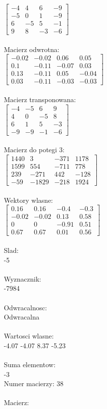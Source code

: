 \documentclass[a4paper,12pt]{article}
\begin{document}
$\begin{bmatrix} -4&4&6&-9\\-5&0&1&-9\\6&-5&5&-1\\9&8&-3&-6 \end{bmatrix}$
\\
\\
Macierz odwrotna:\\

$\begin{bmatrix} -0.02&-0.02&0.06&0.05\\0.1&-0.11&-0.07&0.03\\0.13&-0.11&0.05&-0.04\\0.03&-0.11&-0.03&-0.03 \end{bmatrix}$
\\
\\
Macierz transponowana:\\

$\begin{bmatrix} -4&-5&6&9\\4&0&-5&8\\6&1&5&-3\\-9&-9&-1&-6 \end{bmatrix}$
\\
\\
Macierz do potegi 3:\\

$\begin{bmatrix} 1440&3&-371&1178\\1599&554&-711&778\\239&-271&442&-128\\-59&-1829&-218&1924 \end{bmatrix}$
\\
\\
Wektory wlasne:\\

$\begin{bmatrix} 0.16&0.16&-0.4&-0.3\\-0.02&-0.02&0.13&0.58\\0&0&-0.91&0.51\\0.67&0.67&0.01&0.56 \end{bmatrix}$
\\
\\
Slad:\\
-5
\\
\\
Wyznacznik:\\
-7984
\\
\\
Odwracalnosc:\\
Odwracalna
\\
\\
Wartosci wlasne:\\
-4.07 -4.07 8.37 -5.23
\\
\\
Suma elementow:\\
-3
\\
\newpage
Numer macierzy:
38
\\
\\
Macierz:\\
\end{document}
